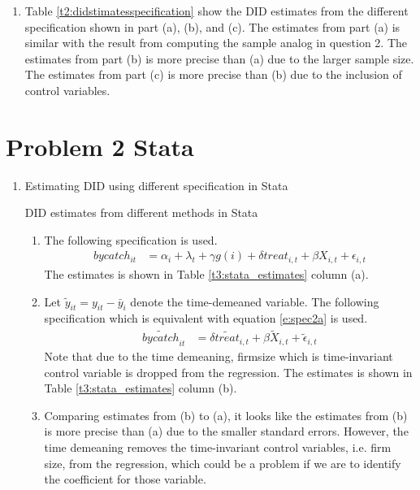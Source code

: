\documentclass{article}
\begin{document}
\begin{enumerate}
\begin{enumerate}
    \item Table \ref{t2:didstimatesspecification} show the DID estimates from the different specification shown in part (a), (b), and (c). The estimates from part (a) is similar with the result from computing the sample analog in question 2. The estimates from part (b) is more precise than (a) due to the larger sample size. The estimates from part (c) is more precise than (b) due to the inclusion of control variables.
    
\end{enumerate}
\end{enumerate} 

\section*{Problem 2 Stata}
\begin{enumerate}
\item Estimating DID using different specification in Stata
\begin{table}[H]\centering
    \begin{threeparttable}
    \caption{DID estimates from different methods in Stata}
    \label{t3:stata_estimates}
    
    \end{threeparttable}
\end{table}
\begin{enumerate}
    \item The following specification is used.
    \begin{align}
        bycatch_{it} &= \alpha_i + \lambda_{t}+ \gamma g(i) + \delta treat_{i,t} + \beta X_{i,t} + \epsilon_{i,t} \label{e:spec2a}
    \end{align}
    The estimates is shown in Table \ref{t3:stata_estimates} column (a).
    \item Let $\tilde{y}_{it}=y_{it}-\bar{y}_i$ denote the time-demeaned variable. The following specification which is equivalent with equation \eqref{e:spec2a} is used.
    \begin{align}
        \widetilde{bycatch}_{it} &= \delta \widetilde{treat}_{i,t} + \beta \tilde{X}_{i,t} + \tilde{\epsilon}_{i,t} \label{e:spec2b}
    \end{align}
    Note that due to the time demeaning, firmsize which is time-invariant control variable is dropped from the regression. The estimates is shown in Table \ref{t3:stata_estimates} column (b).
    \item Comparing estimates from (b) to (a), it looks like the estimates from (b) is more precise than (a) due to the smaller standard errors. However, the time demeaning removes the time-invariant control variables, i.e. firm size, from the regression, which could be a problem if we are to identify the coefficient for those variable.
\end{enumerate}
\end{enumerate}
    
\end{document}
